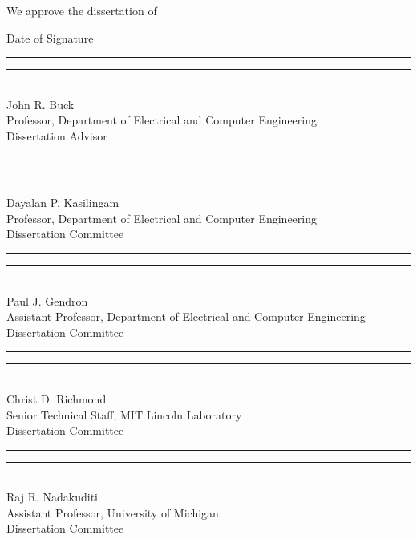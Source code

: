 \enlargethispage{3cm}
\newenvironment{changemargin}[2]{%
  \begin{list}{}{%
       \setlength{\textwidth}{6in} %
       \setlength{\voffset}{0.5in}  %
       \setlength{\marginparsep}{0in}
       \setlength{\topmargin}{0in}%
       \setlength{\headheight}{0in}
       \setlength{\headsep}{0in}
       \setlength{\footskip}{0in}
       \setlength{\footnotesep}{0in}
       \setlength{\rightmargin}{#2}%
       \setlength{\leftmargin}{#1}%
    }%
  \item[]}{\end{list}}
\thispagestyle{empty}
\newcommand{\titlesep}{0.15in}
\singlespacing
\begin{changemargin}{0in}{0in}
  \begin{flushleft}
    \normalsize
    We approve the dissertation of \authorname \par
    \vskip 0.05in
    \hspace{4.45in} Date of Signature
    \vskip 0.1in
    \rule{0.55\textwidth}{0.5pt} \hfill \rule{1.4in}{0.5pt} \\
    John R. Buck \\ Professor, Department of Electrical and Computer Engineering \\ Dissertation Advisor

    \vskip \titlesep    
    \rule{0.55\textwidth}{0.5pt} \hfill \rule{1.4in}{0.5pt} \\ 
    Dayalan P. Kasilingam \\ Professor, Department of Electrical and Computer Engineering \\ Dissertation Committee 
    
    \vskip\titlesep
    \rule{0.55\textwidth}{0.5pt} \hfill \rule{1.4in}{0.5pt} \\
    Paul J. Gendron \\ Assistant Professor, Department of Electrical and Computer Engineering \\ Dissertation Committee

    \vskip\titlesep
    \rule{0.55\textwidth}{0.5pt} \hfill \rule{1.4in}{0.5pt} \\
    Christ D. Richmond \\ Senior Technical Staff, MIT Lincoln Laboratory    \\ Dissertation Committee 

    \vskip\titlesep
    \rule{0.55\textwidth}{0.5pt} \hfill \rule{1.4in}{0.5pt} \\
    Raj R. Nadakuditi \\ Assistant Professor, University of Michigan \\ Dissertation Committee 


\end{flushleft}
\end{changemargin}
